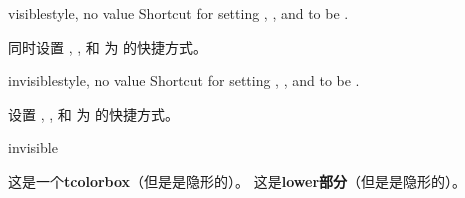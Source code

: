 \begin{docTcbKey}[][doc new and updated={2015-01-06}{2019-03-01}]{visible}{}{style, no value}
Shortcut for setting , , and 
to be .

同时设置 , , 和  为  的快捷方式。
\end{docTcbKey}

\begin{docTcbKey}[][doc new and updated={2015-01-06}{2019-03-01}]{invisible}{}{style, no value}
Shortcut for setting , , and 
to be .

设置 , , 和  为  的快捷方式。
\begin{exdispExample}{invisible}
\begin{tcolorbox}[invisible]
这是一个\textbf{tcolorbox}（但是是隐形的）。
\tcblower
这是\textbf{lower部分}（但是是隐形的）。
\end{tcolorbox}
\end{exdispExample}
\end{docTcbKey}




